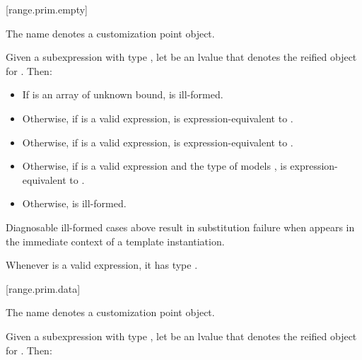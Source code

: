 [range.prim.empty]{}
%

\pnum
The name  denotes a customization point
object.

\pnum
Given a subexpression  with type ,
let  be an lvalue that denotes the reified object for .
Then:

\begin{itemize}
\item
  If  is an array of unknown bound,
   is ill-formed.

\item
  Otherwise, if  is a valid expression,
   is expression-equivalent to
  .

\item
  Otherwise, if  is a valid expression,
   is expression-equiva\-lent to
  .

\item
  Otherwise, if 
  is a valid expression and
  the type of  models ,
   is expression-equivalent to
  .

\item
  Otherwise,  is ill-formed.
\end{itemize}

\pnum
\begin{note}
Diagnosable ill-formed cases above
result in substitution failure when 
appears in the immediate context of a template instantiation.
\end{note}

\pnum
\begin{note}
Whenever  is a valid expression,
it has type .
\end{note}

[range.prim.data]{}
%

\pnum
The name  denotes a customization point
object.

\pnum
Given a subexpression  with type ,
let  be an lvalue that denotes the reified object for .
Then:

